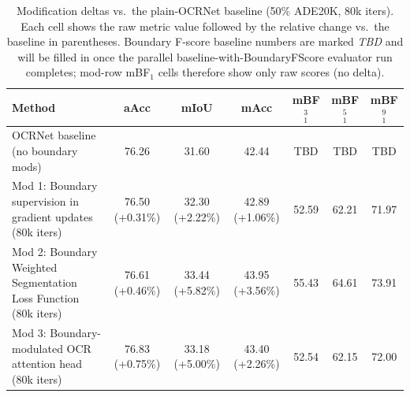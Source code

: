 \begin{table}[t]
\centering
\caption{Modification deltas vs.\ the plain-OCRNet baseline (50\% ADE20K, 80k iters). Each cell shows the raw metric value followed by the relative change vs.\ the baseline in parentheses. Boundary F-score baseline numbers are marked \textit{TBD} and will be filled in once the parallel baseline-with-BoundaryFScore evaluator run completes; mod-row mBF$_1$ cells therefore show only raw scores (no delta).}
\label{tab:delta-vs-baseline}
\begin{tabular}{lcccccc}
\toprule
\textbf{Method} & \textbf{aAcc} & \textbf{mIoU} & \textbf{mAcc} & \textbf{mBF$_1^{3}$} & \textbf{mBF$_1^{5}$} & \textbf{mBF$_1^{9}$} \\
\midrule
OCRNet baseline (no boundary mods) & 76.26 & 31.60 & 42.44 & TBD & TBD & TBD \\
\midrule
Mod 1: Boundary supervision in gradient updates (80k iters) & 76.50 (+0.31\%) & 32.30 (+2.22\%) & 42.89 (+1.06\%) & 52.59 & 62.21 & 71.97 \\
Mod 2: Boundary Weighted Segmentation Loss Function (80k iters) & 76.61 (+0.46\%) & 33.44 (+5.82\%) & 43.95 (+3.56\%) & 55.43 & 64.61 & 73.91 \\
Mod 3: Boundary-modulated OCR attention head (80k iters) & 76.83 (+0.75\%) & 33.18 (+5.00\%) & 43.40 (+2.26\%) & 52.54 & 62.15 & 72.00 \\
\bottomrule
\end{tabular}
\end{table}
